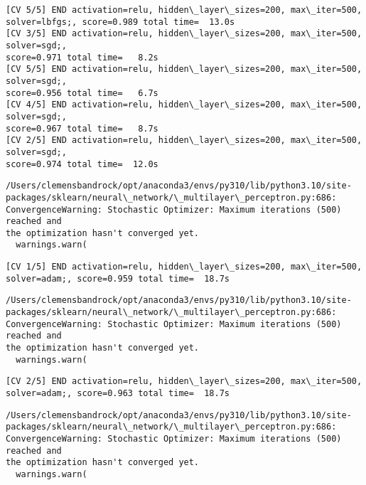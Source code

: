 \documentclass[11pt]{article}
\begin{document}
    \begin{Verbatim}[commandchars=\\\{\}]
[CV 5/5] END activation=relu, hidden\_layer\_sizes=200, max\_iter=500,
solver=lbfgs;, score=0.989 total time=  13.0s
[CV 3/5] END activation=relu, hidden\_layer\_sizes=200, max\_iter=500, solver=sgd;,
score=0.971 total time=   8.2s
[CV 5/5] END activation=relu, hidden\_layer\_sizes=200, max\_iter=500, solver=sgd;,
score=0.956 total time=   6.7s
[CV 4/5] END activation=relu, hidden\_layer\_sizes=200, max\_iter=500, solver=sgd;,
score=0.967 total time=   8.7s
[CV 2/5] END activation=relu, hidden\_layer\_sizes=200, max\_iter=500, solver=sgd;,
score=0.974 total time=  12.0s
    \end{Verbatim}

    \begin{Verbatim}[commandchars=\\\{\}]
/Users/clemensbandrock/opt/anaconda3/envs/py310/lib/python3.10/site-
packages/sklearn/neural\_network/\_multilayer\_perceptron.py:686:
ConvergenceWarning: Stochastic Optimizer: Maximum iterations (500) reached and
the optimization hasn't converged yet.
  warnings.warn(
    \end{Verbatim}

    \begin{Verbatim}[commandchars=\\\{\}]
[CV 1/5] END activation=relu, hidden\_layer\_sizes=200, max\_iter=500,
solver=adam;, score=0.959 total time=  18.7s
    \end{Verbatim}

    \begin{Verbatim}[commandchars=\\\{\}]
/Users/clemensbandrock/opt/anaconda3/envs/py310/lib/python3.10/site-
packages/sklearn/neural\_network/\_multilayer\_perceptron.py:686:
ConvergenceWarning: Stochastic Optimizer: Maximum iterations (500) reached and
the optimization hasn't converged yet.
  warnings.warn(
    \end{Verbatim}

    \begin{Verbatim}[commandchars=\\\{\}]
[CV 2/5] END activation=relu, hidden\_layer\_sizes=200, max\_iter=500,
solver=adam;, score=0.963 total time=  18.7s
    \end{Verbatim}

    \begin{Verbatim}[commandchars=\\\{\}]
/Users/clemensbandrock/opt/anaconda3/envs/py310/lib/python3.10/site-
packages/sklearn/neural\_network/\_multilayer\_perceptron.py:686:
ConvergenceWarning: Stochastic Optimizer: Maximum iterations (500) reached and
the optimization hasn't converged yet.
  warnings.warn(
    \end{Verbatim}
\end{document}
